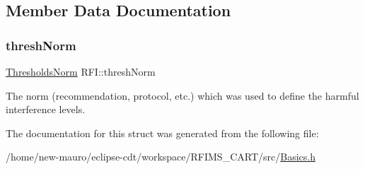\subsection{Member Data Documentation}
\mbox{\label{structRFI_a48905b3dcebf7127bd31315a21a24599}} 
\subsubsection{\texorpdfstring{thresh\+Norm}{threshNorm}}
{\footnotesize\ttfamily \hyperlink{structRFI_a18cfa7d24274bbcd14acc6b513860cb0}{Thresholds\+Norm} R\+F\+I\+::thresh\+Norm}

The norm (recommendation, protocol, etc.) which was used to define the harmful interference levels. 

The documentation for this struct was generated from the following file\+:\begin{DoxyCompactItemize}
\item 
/home/new-\/mauro/eclipse-\/cdt/workspace/\+R\+F\+I\+M\+S\+\_\+\+C\+A\+R\+T/src/\hyperlink{Basics_8h}{Basics.\+h}\end{DoxyCompactItemize}
